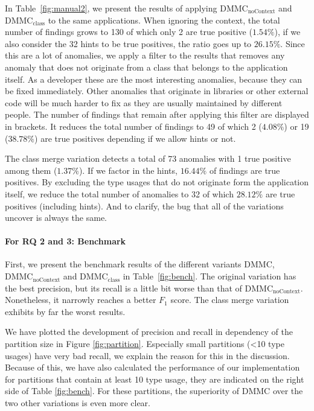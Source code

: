 In Table~\ref{fig:manual2}, we present the results of applying $\text{DMMC}_\text{noContext}$ and $\text{DMMC}_\text{class}$ to the same applications.
When ignoring the context, the total number of findings grows to 130 of which only 2 are true positive ($1.54\%$), if we also consider the 32 hints to be true positives, the ratio goes up to $26.15\%$.
Since this are a lot of anomalies, we apply a filter to the results that removes any anomaly that does not originate from a class that belongs to the application itself.
As a developer these are the most interesting anomalies, because they can be fixed immediately.
Other anomalies that originate in libraries or other external code will be much harder to fix as they are usually maintained by different people.
The number of findings that remain after applying this filter are displayed in brackets.
It reduces the total number of findings to 49 of which 2 ($4.08\%$) or 19 ($38.78\%$) are true positives depending if we allow hints or not.

The class merge variation detects a total of 73 anomalies with 1 true positive among them ($1.37\%$).
If we factor in the hints, $16.44\%$ of findings are true positives.
By excluding the type usages that do not originate form the application itself, we reduce the total number of anomalies to 32 of which $28.12\%$ are true positives (including hints).
And to clarify, the bug that all of the variations uncover is always the same.

\paragraph{For RQ 2 and 3: Benchmark}

First, we present the benchmark results of the different variants $\text{DMMC}$, $\text{DMMC}_\text{noContext}$ and $\text{DMMC}_\text{class}$ in Table~\ref{fig:bench}.
The original variation has the best precision, but its recall is a little bit worse than that of $\text{DMMC}_\text{noContext}$.
Nonetheless, it narrowly reaches a better $F_1$ score.
The class merge variation exhibits by far the worst results.

We have plotted the development of precision and recall in dependency of the partition size in Figure \ref{fig:partition}.
Especially small partitions (<10 type usages) have very bad recall, we explain the reason for this in the discussion.
Because of this, we have also calculated the performance of our implementation for partitions that contain at least 10 type usage, they are indicated on the right side of Table \ref{fig:bench}.
For these partitions, the superiority of $\text{DMMC}$ over the two other variations is even more clear.


